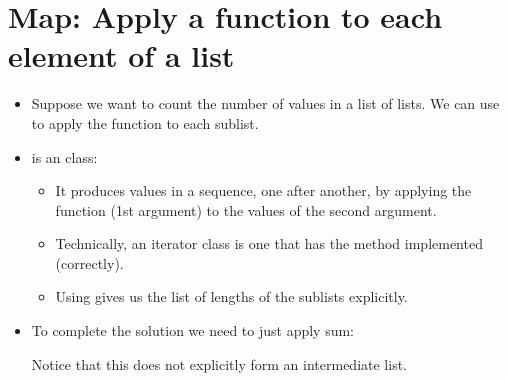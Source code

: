 \documentclass[letterpaper,10pt,english]{sphinxmanual}
\begin{document}
\section{Map: Apply a function to each element of a list}
\label{\detokenize{lecture_notes/lec24_functional:map-apply-a-function-to-each-element-of-a-list}}\begin{itemize}
\item {} 
Suppose we want to count the number of values in a list of lists.
We can use  to apply the  function to each sublist.

%
\begin{sphinxVerbatim}[commandchars=\\\{\}]
  \PYG{p}{[} \PYG{p}{[}   \PYG{p}{]} \PYG{p}{[}\PYG{p}{]} \PYG{p}{[} \PYG{p}{]} \PYG{p}{[}\PYG{p}{]} \PYG{p}{]}
    
\end{sphinxVerbatim}

\item {} 
 is an  class:
\begin{itemize}
\item {} 
It produces values in a sequence, one after another, by applying
the function (1st argument) to the values of the second argument.

\item {} 
Technically, an iterator class is one that has the 
method implemented (correctly).

\item {} 
Using  gives us the list of lengths of the sublists
explicitly.

\end{itemize}

\item {} 
To complete the solution we need to just apply sum:

%
\begin{sphinxVerbatim}[commandchars=\\\{\}]
\end{sphinxVerbatim}

Notice that this does not explicitly form an intermediate list.

\end{itemize}
\end{document}
